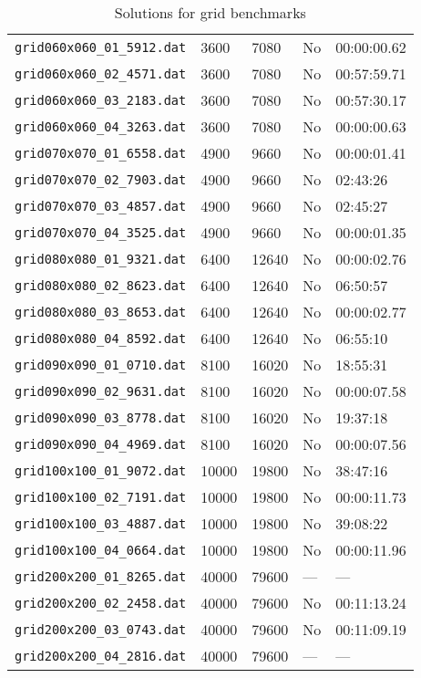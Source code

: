 \documentclass{article}
\begin{document}
\begin{table}
\begin{tabular}{y{3.6cm}x{1cm}x{1.5cm}x{1.5cm}y{1.5cm}}
    \verb|grid060x060_01_5912.dat| &  3600 &  7080 &  No & 00:00:00.62 \\
    \verb|grid060x060_02_4571.dat| &  3600 &  7080 &  No & 00:57:59.71 \\
    \verb|grid060x060_03_2183.dat| &  3600 &  7080 &  No & 00:57:30.17 \\
    \verb|grid060x060_04_3263.dat| &  3600 &  7080 &  No & 00:00:00.63 \\
    \verb|grid070x070_01_6558.dat| &  4900 &  9660 &  No & 00:00:01.41 \\
    \verb|grid070x070_02_7903.dat| &  4900 &  9660 &  No & 02:43:26 \\
    \verb|grid070x070_03_4857.dat| &  4900 &  9660 &  No & 02:45:27 \\
    \verb|grid070x070_04_3525.dat| &  4900 &  9660 &  No & 00:00:01.35 \\
    \verb|grid080x080_01_9321.dat| &  6400 & 12640 &  No & 00:00:02.76 \\
    \verb|grid080x080_02_8623.dat| &  6400 & 12640 &  No & 06:50:57 \\
    \verb|grid080x080_03_8653.dat| &  6400 & 12640 &  No & 00:00:02.77 \\
    \verb|grid080x080_04_8592.dat| &  6400 & 12640 &  No & 06:55:10 \\
    \verb|grid090x090_01_0710.dat| &  8100 & 16020 &  No & 18:55:31 \\
    \verb|grid090x090_02_9631.dat| &  8100 & 16020 &  No & 00:00:07.58 \\
    \verb|grid090x090_03_8778.dat| &  8100 & 16020 &  No & 19:37:18 \\
    \verb|grid090x090_04_4969.dat| &  8100 & 16020 &  No & 00:00:07.56 \\
    \verb|grid100x100_01_9072.dat| & 10000 & 19800 &  No & 38:47:16 \\
    \verb|grid100x100_02_7191.dat| & 10000 & 19800 &  No & 00:00:11.73 \\
    \verb|grid100x100_03_4887.dat| & 10000 & 19800 &  No & 39:08:22 \\
    \verb|grid100x100_04_0664.dat| & 10000 & 19800 &  No & 00:00:11.96 \\
    \verb|grid200x200_01_8265.dat| & 40000 & 79600 & --- & --- \\
    \verb|grid200x200_02_2458.dat| & 40000 & 79600 &  No & 00:11:13.24 \\
    \verb|grid200x200_03_0743.dat| & 40000 & 79600 &  No & 00:11:09.19 \\
    \verb|grid200x200_04_2816.dat| & 40000 & 79600 & --- & --- \\
  \end{tabular}
  \caption{Solutions for grid benchmarks}
\end{table}
\end{document}
